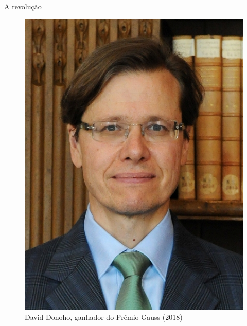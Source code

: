 \documentclass{beamer}
\begin{document}
\begin{frame}{A revolu\c{c}\~ao}
    \begin{figure}
        \centering
        \includegraphics[height=0.7\textheight]{figs/david-donoho.jpg}
        \caption{David Donoho, ganhador do Pr\^emio Gauss (2018)}
    \end{figure}
\end{frame}
\end{document}
